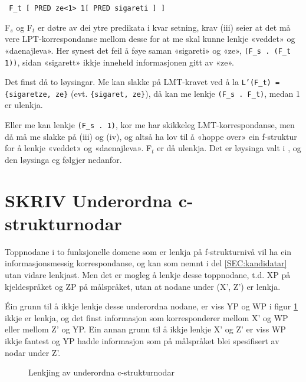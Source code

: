 \documentclass[11pt,a4paper,oneside,draft]{book}
\begin{document}
\begin{verbatim}
 F_t [ PRED ze<1> 1[ PRED sigareti ] ]
\end{verbatim}


F$_s$ og F$_t$ er døtre av dei ytre predikata i kvar setning, krav (iii)
seier at det må vere LPT-korrespondanse mellom desse for at me skal
kunne lenkje «veddet» og «daenajleva».  Her synest det feil å føye
saman «sigareti» og «ze», \texttt{(F\_s . (F\_t 1))}, sidan «sigarett» ikkje
inneheld informasjonen gitt av «ze».

Det finst då to løysingar. Me kan slakke på LMT-kravet ved å la
\texttt{L'(F\_t) = \{sigaretze, ze\}} (evt. \texttt{\{sigaret, ze\}}), då kan me lenkje
\texttt{(F\_s . F\_t)}, medan 1 er ulenkja.

Eller me kan lenkje \texttt{(F\_s . 1)}, kor me har skikkeleg
LMT-korrespondanse, men då må me slakke på (iii) og (iv), og altså ha
lov til å «hoppe over» ein f-struktur for å lenkje «veddet» og
«daenajleva». F$_t$ er då ulenkja. Det er løysinga valt i
\citet[s.~75,~fotnote~3]{dyvik2009lmp}, og den løysinga eg følgjer
nedanfor.

\section{\textbf{SKRIV} Underordna c-strukturnodar}
\label{sec-3.9}

\label{SEC:subnode}

Toppnodane i to funksjonelle domene som er lenkja på f-strukturnivå
vil ha ein informasjonsmessig korrespondanse, og kan som nemnt i del
\ref{SEC:kandidatar} utan vidare lenkjast. Men det er mogleg å lenkje
desse toppnodane, t.d. XP på kjeldespråket og ZP på målspråket, utan
at nodane under (X', Z') er lenkja. 

Éin grunn til å ikkje lenkje desse underordna nodane, er viss YP og WP
i figur \ref{fig:subnode} ikkje er lenkja, og det finst informasjon
som korresponderer mellom X' og WP eller mellom Z' og YP.
Ein annan grunn til å ikkje lenkje X' og Z' er viss WP ikkje fantest
og YP hadde informasjon som på målspråket blei spesifisert av nodar
under Z'. 

\begin{figure}[htp]
\centering
   \caption{Lenkjing av underordna c-strukturnodar}
   \label{fig:subnode}
  \end{figure}
\end{document}
